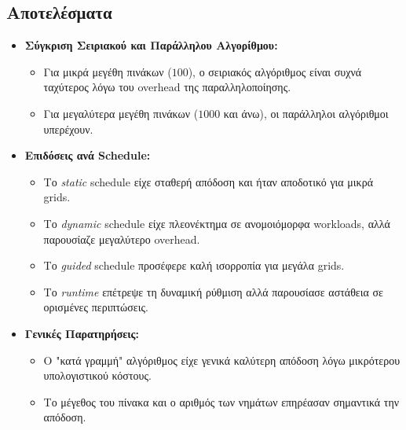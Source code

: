 \documentclass{article}
\begin{document}
\subsection*{Αποτελέσματα} 
\begin{itemize} 
    \item \textbf{Σύγκριση Σειριακού και Παράλληλου Αλγορίθμου:} 
    \begin{itemize} 
        \item Για μικρά μεγέθη πινάκων ($100$), ο σειριακός αλγόριθμος είναι συχνά ταχύτερος λόγω του overhead της παραλληλοποίησης. 
        \item Για μεγαλύτερα μεγέθη πινάκων ($1000$ και άνω), οι παράλληλοι αλγόριθμοι υπερέχουν. 
    \end{itemize} 
    \item \textbf{Επιδόσεις ανά Schedule:} 
    \begin{itemize} 
        \item Το \textit{static} schedule είχε σταθερή απόδοση και ήταν αποδοτικό για μικρά grids. 
        \item Το \textit{dynamic} schedule είχε πλεονέκτημα σε ανομοιόμορφα workloads, αλλά παρουσίαζε μεγαλύτερο overhead. 
        \item Το \textit{guided} schedule προσέφερε καλή ισορροπία για μεγάλα grids. 
        \item Το \textit{runtime} επέτρεψε τη δυναμική ρύθμιση αλλά παρουσίασε αστάθεια σε ορισμένες περιπτώσεις. 
    \end{itemize} 
    \item \textbf{Γενικές Παρατηρήσεις:} 
    \begin{itemize} 
        \item Ο "κατά γραμμή" αλγόριθμος είχε γενικά καλύτερη απόδοση λόγω μικρότερου υπολογιστικού κόστους. 
        \item Το μέγεθος του πίνακα και ο αριθμός των νημάτων επηρέασαν σημαντικά την απόδοση. 
    \end{itemize} 
\end{itemize}
\end{document}
